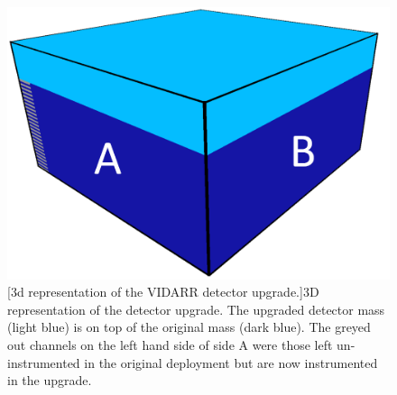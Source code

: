 \begin{figure}[!h]
 \centering
 \includegraphics[width=0.5\linewidth]{Chapter3/Figs/detectorModelLabelled.png}
 [3d representation of the VIDARR detector upgrade.]{3D representation of the detector upgrade. The upgraded detector mass (light blue) is on top of the original mass (dark blue). The greyed out channels on the left hand side of side A were those left un-instrumented in the original deployment but are now instrumented in the upgrade.} 
 \label{fig:detectorUpgradedmassOutlined}
\end{figure}

